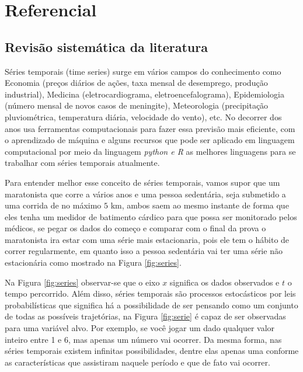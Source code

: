 \section{Referencial}\label{sec:refteo}

    

\subsection{Revisão sistemática da literatura} \label{subsec:revisão}

Séries temporais (time series) surge em vários campos do conhecimento como Economia (preços diários de ações, taxa mensal de desemprego, produção industrial), Medicina (eletrocardiograma, eletroencefalograma), Epidemiologia (número mensal de novos casos de meningite), Meteorologia (precipitação pluviométrica, temperatura diária, velocidade do vento), etc. No decorrer dos anos usa ferramentas computacionais para fazer essa previsão mais eficiente, com o aprendizado de máquina e alguns recursos que pode ser aplicado em linguagem computacional por meio da linguagem \textit{python e R}  as melhores linguagens para se trabalhar com séries temporais atualmente.

Para entender melhor esse conceito de séries temporais, vamos supor que um maratonista que corre a vários anos e uma pessoa sedentária, seja submetido a uma corrida de no máximo $5$ km, ambos saem ao mesmo instante de forma que eles tenha um medidor de batimento cárdico para que possa ser monitorado pelos médicos, se pegar os dados do começo e comparar com o final da prova o maratonista ira estar com uma série mais estacionaria, pois ele tem o hábito de correr regularmente, em quanto isso a pessoa sedentária vai ter uma série não estacionária como mostrado na Figura \ref{fig:series}.



Na Figura \ref{fig:series} observar-se que o eixo $x$ significa os dados observados e $t$ o tempo percorrido.
Além disso, séries temporais são processos estocásticos por leis probabilísticas que significa há a possibilidade de ser pensando como um conjunto de todas as possíveis trajetórias, na Figura \ref{fig:serie} é capaz de ser observadas para uma variável alvo. Por exemplo, se você jogar um dado qualquer valor inteiro entre 1 e 6, mas apenas um número vai ocorrer. Da mesma forma, nas séries temporais existem infinitas possibilidades, dentre elas apenas uma conforme as características que assistiram naquele período e que de fato vai ocorrer.

